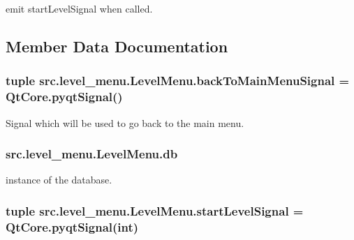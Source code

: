 emit start\+Level\+Signal when called. 



\subsection{Member Data Documentation}
\hypertarget{classsrc_1_1level__menu_1_1_level_menu_a769225d8895542b2c7118110d7b2ff9d}{}
\subsubsection[{back\+To\+Main\+Menu\+Signal}]{\setlength{\rightskip}{0pt plus 5cm}tuple src.\+level\+\_\+menu.\+Level\+Menu.\+back\+To\+Main\+Menu\+Signal = Qt\+Core.\+pyqt\+Signal()\hspace{0.3cm}{\ttfamily [static]}}\label{classsrc_1_1level__menu_1_1_level_menu_a769225d8895542b2c7118110d7b2ff9d}


Signal which will be used to go back to the main menu. 

\hypertarget{classsrc_1_1level__menu_1_1_level_menu_a3224111dd78be1b15cc943f41daef0cf}{}
\subsubsection[{db}]{\setlength{\rightskip}{0pt plus 5cm}src.\+level\+\_\+menu.\+Level\+Menu.\+db}\label{classsrc_1_1level__menu_1_1_level_menu_a3224111dd78be1b15cc943f41daef0cf}


instance of the database. 

\hypertarget{classsrc_1_1level__menu_1_1_level_menu_a14a5a5bd905bb0d8e732a33bed71ef44}{}
\subsubsection[{start\+Level\+Signal}]{\setlength{\rightskip}{0pt plus 5cm}tuple src.\+level\+\_\+menu.\+Level\+Menu.\+start\+Level\+Signal = Qt\+Core.\+pyqt\+Signal(int)\hspace{0.3cm}{\ttfamily [static]}}\label{classsrc_1_1level__menu_1_1_level_menu_a14a5a5bd905bb0d8e732a33bed71ef44}


